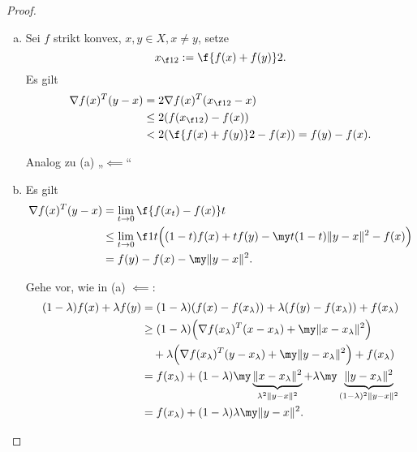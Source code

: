 \begin{st}
\begin{proof}
\begin{enumerate}[(a)]
\begin{seg}[„$\impliedby$“]
				\end{seg}
			\item
				\begin{seg}[„$\implies$“]
					Sei $f$ strikt konvex, $x, y \in X, x\neq y$, setze
					\[
						x_{\f 12} := \f {f(x) + f(y)}2.
					\]
					Es gilt
					\begin{align*}
						\nabla f(x)^T (y-x)
						&= 2 \nabla f(x)^T (x_{\f 12} - x) \\
						&\le 2 (f(x_{\f 12}) - f(x)) \\
						&< 2 (\f {f(x) + f(y)}2 - f(x))
						= f(y) - f(x).
					\end{align*}
				\end{seg}
				\begin{seg}[„$\impliedby$“]
					Analog zu (a) „$\impliedby$“
				\end{seg}
			\item
				\begin{seg}[„$\implies$“]
					Es gilt
					\begin{align*}
						\nabla f(x)^T (y-x)
						&= \lim_{t\to 0} \f {f(x_t) - f(x)}t \\
						&\le \lim_{t\to 0} \f 1t \Big( (1-t)f(x) + tf(y) - \my t(1-t)\|y-x\|^2 - f(x) \Big) \\
						&= f(y) - f(x) - \my \|y-x\|^2.
					\end{align*}
				\end{seg}
				\begin{seg}[„$\impliedby$“]
					Gehe vor, wie in (a) $\impliedby$:
					\begin{align*}
						(1-\lambda) f(x) + \lambda f(y)
						&= (1-\lambda) (f(x) - f(x_\lambda)) + \lambda (f(y) - f(x_\lambda)) + f(x_\lambda) \\
						&\ge (1-\lambda) \Big(\nabla f(x_\lambda)^T (x-x_\lambda) + \my \|x-x_\lambda\|^2 \Big) \\
							&\quad + \lambda \Big( \nabla f(x_\lambda)^T (y-x_\lambda) + \my \|y-x_\lambda\|^2 \Big) + f(x_\lambda) \\
						&= f(x_\lambda) + (1-\lambda)\my \underbrace{\|x - x_\lambda\|^2}_{\lambda^2 \|y-x\|^2} + \lambda \my \underbrace{\|y-x_\lambda\|^2}_{(1-\lambda)^2\|y-x\|^2} \\
						&=  f(x_\lambda) + (1-\lambda)\lambda \my \|y-x\|^2.
					\end{align*}
				\end{seg}
		\end{enumerate}
	\end{proof}
\end{st}

